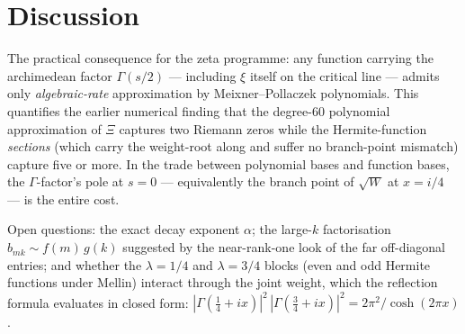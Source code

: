 \documentclass[11pt,a4paper]{article}
\theoremstyle{definition}
\theoremstyle{plain}
\begin{document}
\section{Discussion}

The practical consequence for the zeta programme: any function carrying
the archimedean factor $\Gamma(s/2)$ --- including $\xi$ itself on the
critical line --- admits only \emph{algebraic-rate} approximation by
Meixner--Pollaczek polynomials. This quantifies the earlier numerical
finding that the degree-$60$ polynomial approximation of $\Xi$ captures
two Riemann zeros while the Hermite-function \emph{sections} (which
carry the weight-root along and suffer no branch-point mismatch)
capture five or more. In the trade between polynomial bases and
function bases, the $\Gamma$-factor's pole at $s = 0$ --- equivalently
the branch point of $\sqrt{W}$ at $x = i/4$ --- is the entire cost.

Open questions: the exact decay exponent $\alpha$; the large-$k$
factorisation $b_{mk} \sim f(m)\, g(k)$ suggested by the near-rank-one
look of the far off-diagonal entries; and whether the $\lambda = 1/4$
and $\lambda = 3/4$ blocks (even and odd Hermite functions under
Mellin) interact through the joint weight, which the reflection formula
evaluates in closed form:
$|\Gamma(\tfrac14+ix)|^2\, |\Gamma(\tfrac34+ix)|^2 = 2\pi^2 /
\cosh(2\pi x)$.
\end{document}
